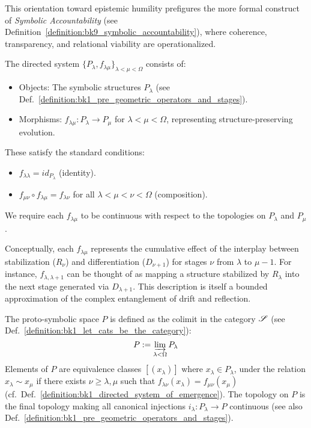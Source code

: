 \begin{remark}
    This orientation toward epistemic humility prefigures the more formal construct of \emph{Symbolic Accountability} (see Definition~\ref{definition:bk9_symbolic_accountability}), where coherence, transparency, and relational viability are operationalized.
\end{remark}
\begin{definition}
\label{definition:bk1_directed_system_of_emergence}
The directed system $\{P_\lambda, f_{\lambda\mu}\}_{\lambda < \mu < \Omega}$ consists of:
\begin{itemize}
    \item Objects: The symbolic structures $P_\lambda$ (see Def.~\ref{definition:bk1_pre_geometric_operators_and_stages}).
    \item Morphisms: $f_{\lambda\mu}: P_\lambda \to P_\mu$ for $\lambda < \mu < \Omega$, representing structure-preserving evolution.
\end{itemize}
These satisfy the standard conditions:
\begin{itemize}
    \item $f_{\lambda\lambda} = id_{P_\lambda}$ (identity).
    \item $f_{\mu\nu} \circ f_{\lambda\mu} = f_{\lambda\nu}$ for all $\lambda < \mu < \nu < \Omega$ (composition).
\end{itemize}
We require each $f_{\lambda\mu}$ to be continuous with respect to the topologies on $P_\lambda$ and $P_\mu$.

Conceptually, each $f_{\lambda\mu}$ represents the cumulative effect of the interplay between stabilization ($R_\nu$) and differentiation ($D_{\nu+1}$) for stages $\nu$ from $\lambda$ to $\mu-1$. For instance, $f_{\lambda, \lambda+1}$ can be thought of as mapping a structure stabilized by $R_\lambda$ into the next stage generated via $D_{\lambda+1}$. This description is itself a bounded approximation of the complex entanglement of drift and reflection.
\end{definition}
\begin{definition}
\label{definition:bk1_proto_symbolic_space}
The proto-symbolic space $P$ is defined as the colimit in the category $\mathscr{S}$ (see Def.~\ref{definition:bk1_let_cats_be_the_category}):
\[
P := \varinjlim_{\lambda < \Omega} P_\lambda
\]
Elements of $P$ are equivalence classes $[(x_\lambda)]$ where $x_\lambda \in P_\lambda$, under the relation $x_\lambda \sim x_\mu$ if there exists $\nu \geq \lambda, \mu$ such that $f_{\lambda\nu}(x_\lambda) = f_{\mu\nu}(x_\mu)$ (cf.~Def.~\ref{definition:bk1_directed_system_of_emergence}). The topology on $P$ is the final topology making all canonical injections $i_\lambda: P_\lambda \to P$ continuous (see also Def.~\ref{definition:bk1_pre_geometric_operators_and_stages}).
\end{definition}
